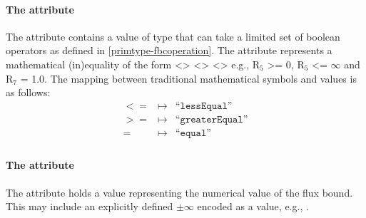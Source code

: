 \paragraph{The  attribute}
The  attribute contains a value of type
 that can take a limited set of boolean operators as
defined in \ref{primtype-fbcoperation}. The  attribute
represents a mathematical (in)equality of the form <>
<> <> e.g., R$_{5}$
>= 0, R$_{5}$ <= $\infty$ and R$_{7}$ = 1.0. The mapping between traditional
mathematical symbols and  values is as follows:
%
\begin{eqnarray*}
\label{fb-operation-enum}
 \nonumber
  <= & \mapsto & \textrm{``}\mathtt{lessEqual}\textrm{''}\\
  >= & \mapsto & \textrm{``}\mathtt{greaterEqual}\textrm{''}\\
  = & \mapsto & \textrm{``}\mathtt{equal}\textrm{''}\\
\end{eqnarray*}
%
\paragraph{The  attribute}
The  attribute holds a  value representing the
numerical value of the flux bound. This may include an explicitly defined
$\pm\infty$ encoded as a value, e.g., .

\pagebreak

